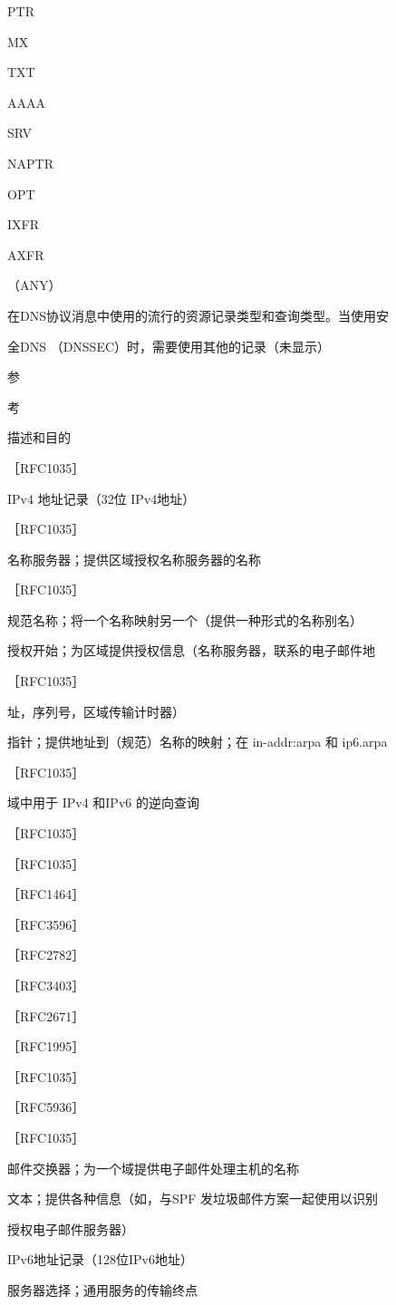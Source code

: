 PTR

MX

TXT

AAAA

SRV

NAPTR

OPT

IXFR

AXFR

（ANY）

在DNS协议消息中使用的流行的资源记录类型和查询类型。当使用安

全DNS （DNSSEC）时，需要使用其他的记录（未显示）

参

考

描述和目的

［RFC1035］

IPv4 地址记录（32位 IPv4地址）

［RFC1035］

名称服务器；提供区域授权名称服务器的名称

［RFC1035］

规范名称；将一个名称映射另一个（提供一种形式的名称别名）

授权开始；为区域提供授权信息（名称服务器，联系的电子邮件地

［RFC1035］

址，序列号，区域传输计时器）

指针；提供地址到（规范）名称的映射；在 in-addr:arpa 和 ip6.arpa

［RFC1035］

域中用于 IPv4 和IPv6 的逆向查询

［RFC1035］

［RFC1035］

［RFC1464］

［RFC3596］

［RFC2782］

［RFC3403］

［RFC2671］

［RFC1995］

［RFC1035］

［RFC5936］

［RFC1035］

邮件交换器；为一个域提供电子邮件处理主机的名称

文本；提供各种信息（如，与SPF 发垃圾邮件方案一起使用以识别

授权电子邮件服务器）

IPv6地址记录（128位IPv6地址）

服务器选择；通用服务的传输终点

